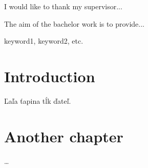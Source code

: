 \documentclass[11pt,oneside,draft]{fithesis2}
\begin{document}
\FrontMatter
\ThesisTitlePage

\begin{ThesisDeclaration}
\DeclarationText
\AdvisorName
\end{ThesisDeclaration}

\begin{ThesisThanks}
I would like to thank my supervisor...
\end{ThesisThanks}

\begin{ThesisAbstract}
The aim of the bachelor work is to provide...
\end{ThesisAbstract}

\begin{ThesisKeyWords}
keyword1, keyword2, etc.
\end{ThesisKeyWords}

\tableofcontents

\MainMatter

\chapter{Introduction}
Ľaľa ťapina tĺk ďateľ.

\chapter{Another chapter}
\dots



\end{document}
